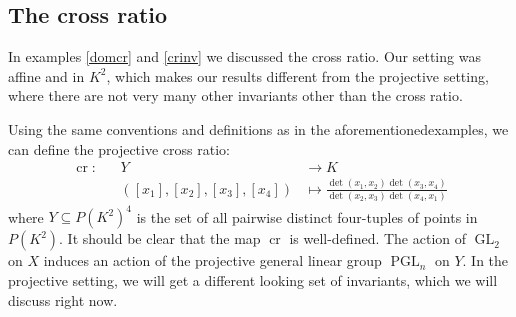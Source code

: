 \subsection{The cross ratio}
In examples \ref{domcr} and \ref{crinv} we discussed the cross ratio.
Our setting was affine and in $K^2$, which makes our results different from the projective setting, where there are not very many other invariants other than the cross ratio.

Using the same conventions and definitions as in the aforementioned\linebreak examples, we can define the projective cross ratio:
\begin{equation*}
  \begin{aligned}
    \operatorname{cr} \colon&&Y&\longrightarrow K \\
    &&([x_1],[x_2],[x_3],[x_4]) &\longmapsto \frac{\operatorname{det}(x_1,x_2)\operatorname{det}(x_3,x_4)}{\operatorname{det}(x_2,x_3)\operatorname{det}(x_4,x_1)}
  \end{aligned}
\end{equation*}
where $Y \subseteq P(K^2)^4$ is the set of all pairwise distinct four-tuples of points in $P(K^2)$.
It should be clear that the map $\operatorname{cr}$ is well-defined.
The action of $\operatorname{GL}_2$ on $X$ induces an action of the projective general linear group $\operatorname{PGL}_n$ on $Y$.
In the projective setting, we will get a different looking set of invariants, which we will discuss right now.

